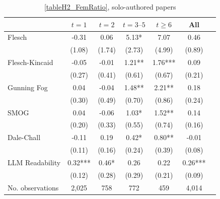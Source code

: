 \begin{table}
    \footnotesize
    \centering
    \begin{threeparttable}
        \caption{\autoref{tableH2_FemRatio}, solo-authored papers}
        \label{tableH2_FemSolo}
        \begin{tabular}{p{3cm}S@{}S@{}S@{}S@{}S@{}S@{}}
            \toprule
            &{\(t=1\)}&{\(t=2\)}&{\(t=3\text{--}5\)}&{\(t\ge6\)}&{All}\\
            \midrule
            Flesch                        &       -0.31   &        0.06   &        5.13*  &        7.07   &        0.46   \\
                                          &      (1.08)   &      (1.74)   &      (2.73)   &      (4.99)   &      (0.89)   \\
            Flesch-Kincaid                &       -0.05   &       -0.01   &        1.21** &        1.76***&        0.09   \\
                                          &      (0.27)   &      (0.41)   &      (0.61)   &      (0.67)   &      (0.21)   \\
            Gunning Fog                   &        0.04   &       -0.04   &        1.48** &        2.21** &        0.18   \\
                                          &      (0.30)   &      (0.49)   &      (0.70)   &      (0.86)   &      (0.24)   \\
            SMOG                          &        0.04   &       -0.06   &        1.03*  &        1.52** &        0.14   \\
                                          &      (0.20)   &      (0.33)   &      (0.55)   &      (0.74)   &      (0.16)   \\
            Dale-Chall                    &       -0.11   &        0.19   &        0.42*  &        0.80** &       -0.01   \\
                                          &      (0.11)   &      (0.16)   &      (0.24)   &      (0.39)   &      (0.08)   \\
            LLM Readability               &        0.32***&        0.46*  &        0.26   &        0.22   &        0.26***\\
                                          &      (0.12)   &      (0.28)   &      (0.29)   &      (0.21)   &      (0.09)   \\
            \midrule
            No. observations              &       2,025   &         758   &         772   &         459   &       4,014   \\

\end{tabular}
\end{threeparttable}
\end{table}
